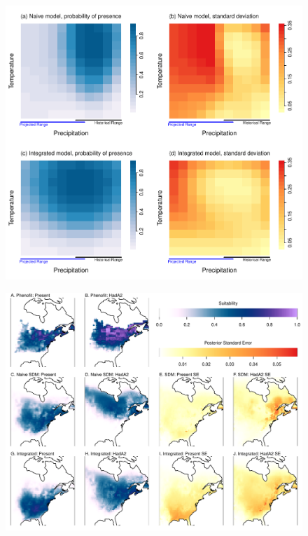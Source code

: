 \documentclass[11pt]{article}
\begin{document}
\newpage
\begin{figure}[h!]
	\includegraphics[width=5.25in]{ex1_map.pdf}
	\caption{}
	\label{fig:ex1_map}
\end{figure}


\newpage
\begin{figure}[h!]
	\includegraphics[width=6in]{ex2.pdf}
	\caption{}
	\label{fig:ex2}
\end{figure}
\end{document}
